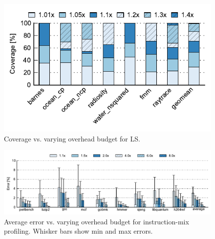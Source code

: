 \begin{figure}
  \begin{center}
    \includegraphics[width=\linewidth]{figs/data_ls_sweep.pdf}
    \vspace{-0.2in}
    \caption{Coverage vs. varying overhead budget for LS.}
    \label{fig:evaluation.ls_sweep}
    \vspace{-0.3in}
  \end{center}
\end{figure}

\begin{figure}
  \begin{center}
    \includegraphics[width=\linewidth, clip=true]{figs/data_imp_sweep.pdf}
    \vspace{-0.2in}
    \caption{Average error vs. varying overhead budget for instruction-mix profiling. Whisker bars show min and max errors.}
    \label{fig:evaluation.imp_sweep}
    \vspace{-0.3in}
  \end{center}
\end{figure}

